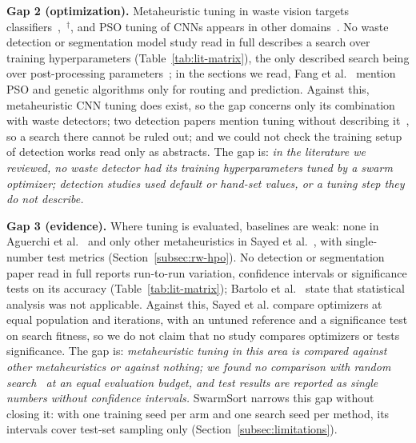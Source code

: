 \textbf{Gap 2 (optimization).} Metaheuristic tuning in waste vision targets classifiers~\cite{sayed2024intelligent},~\cite{mao2021recycling}$^{\dagger}$, and PSO tuning of CNNs appears in other domains~\cite{aguerchi2024cnn}. No waste detection or segmentation model study read in full describes a search over training hyperparameters (Table~\ref{tab:lit-matrix}), the only described search being over post-processing parameters~\cite{wang2020multilevel}; in the sections we read, Fang et al.~\cite{fang2023artificial} mention PSO and genetic algorithms only for routing and prediction. Against this, metaheuristic CNN tuning does exist, so the gap concerns only its combination with waste detectors; two detection papers mention tuning without describing it~\cite{liao2022realtime,bartolo2025learning}, so a search there cannot be ruled out; and we could not check the training setup of detection works read only as abstracts. The gap is: \emph{in the literature we reviewed, no waste detector had its training hyperparameters tuned by a swarm optimizer; detection studies used default or hand-set values, or a tuning step they do not describe.}

\textbf{Gap 3 (evidence).} Where tuning is evaluated, baselines are weak: none in Aguerchi et al.~\cite{aguerchi2024cnn} and only other metaheuristics in Sayed et al.~\cite{sayed2024intelligent}, with single-number test metrics (Section~\ref{subsec:rw-hpo}). No detection or segmentation paper read in full reports run-to-run variation, confidence intervals or significance tests on its accuracy (Table~\ref{tab:lit-matrix}); Bartolo et al.~\cite{bartolo2025learning} state that statistical analysis was not applicable. Against this, Sayed et al. compare optimizers at equal population and iterations, with an untuned reference and a significance test on search fitness, so we do not claim that no study compares optimizers or tests significance. The gap is: \emph{metaheuristic tuning in this area is compared against other metaheuristics or against nothing; we found no comparison with random search~\cite{bergstra2012random} at an equal evaluation budget, and test results are reported as single numbers without confidence intervals.} SwarmSort narrows this gap without closing it: with one training seed per arm and one search seed per method, its intervals cover test-set sampling only (Section~\ref{subsec:limitations}).

